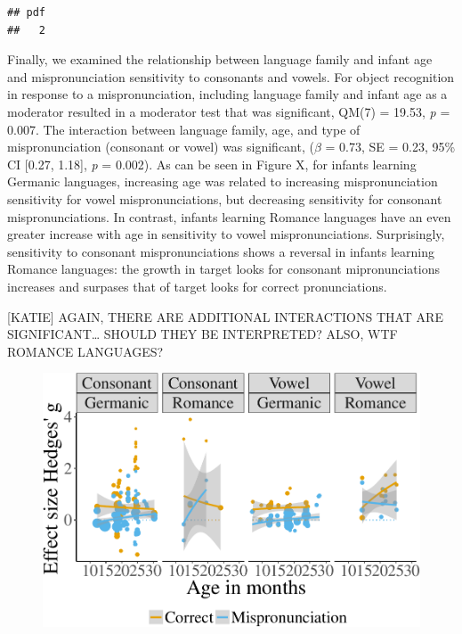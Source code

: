 \documentclass[man]{apa6}
\theoremstyle{definition}
\theoremstyle{definition}
\theoremstyle{definition}
\theoremstyle{remark}
\begin{document}
\begin{verbatim}
## pdf 
##   2
\end{verbatim}

Finally, we examined the relationship between language family and infant
age and mispronunciation sensitivity to consonants and vowels. For
object recognition in response to a mispronunciation, including language
family and infant age as a moderator resulted in a moderator test that
was significant, QM(7) = 19.53, \emph{p} = 0.007. The interaction
between language family, age, and type of mispronunciation (consonant or
vowel) was significant, (\(\beta\) = 0.73, SE = 0.23, 95\% CI {[}0.27,
1.18{]}, \emph{p} = 0.002). As can be seen in Figure X, for infants
learning Germanic languages, increasing age was related to increasing
mispronunciation sensitivity for vowel mispronunciations, but decreasing
sensitivity for consonant mispronunciations. In contrast, infants
learning Romance languages have an even greater increase with age in
sensitivity to vowel mispronunciations. Surprisingly, sensitivity to
consonant mispronunciations shows a reversal in infants learning Romance
languages: the growth in target looks for consonant mipronunciations
increases and surpases that of target looks for correct pronunciations.

{[}KATIE{]} AGAIN, THERE ARE ADDITIONAL INTERACTIONS THAT ARE
SIGNIFICANT\ldots{} SHOULD THEY BE INTERPRETED? ALSO, WTF ROMANCE
LANGUAGES?

\begin{figure}[htbp]
\centering
\includegraphics{Paper_Analyses_files/figure-latex/PlotCVEffect_cond_age_fam-1.pdf}
\caption{}
\end{figure}
\end{document}
